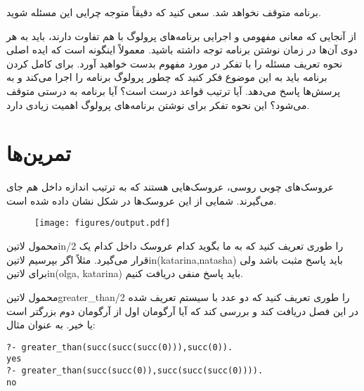 برنامه متوقف نخواهد شد. سعی کنید که دقیقاً متوجه چرایی این مسئله شوید.

از آنجایی که معانی مفهومی و اجرایی برنامه‌های پرولوگ با هم تفاوت دارند، باید به هر دوی آن‌ها در زمان نوشتن برنامه توجه داشته باشید. معمولاً اینگونه است که ایده اصلی نحوه تعریف مسئله را با تفکر در مورد مفهوم بدست خواهید آورد. برای کامل کردن برنامه باید به این موضوع فکر کنید که چطور پرولوگ برنامه را اجرا می‌کند و به پرسش‌ها پاسخ می‌دهد. آیا ترتیب قواعد درست است؟ آیا برنامه به درستی متوقف می‌شود؟ این نحوه تفکر برای نوشتن برنامه‌های پرولوگ اهمیت زیادی دارد.

\clearpage

\section{تمرین‌ها}
\begin{exercise}
عروسک‌های چوبی روسی، عروسک‌هایی هستند که به ترتیب اندازه داخل هم جای می‌گیرند. شمایی از این عروسک‌ها در شکل نشان داده شده است.

\begin{figure}[h]
\centering
\texttt{[image: figures/output.pdf]}
\label{fig:dataset-size-degree}
\end{figure}

محمول ‌لاتین{in/2} را طوری تعریف کنید که به ما بگوید کدام عروسک داخل کدام یک قرار می‌گیرد. مثلاً اگر بپرسیم ‌لاتین{in(katarina,natasha)} باید پاسخ مثبت باشد ولی برای ‌لاتین{in(olga, katarina)} باید پاسخ منفی دریافت کنیم.
\end{exercise}

\begin{exercise}
محمول ‌لاتین{greater\_than/2} را طوری تعریف کنید که دو عدد با سیستم تعریف شده در این فصل دریافت کند و بررسی کند که آیا آرگومان اول از آرگومان دوم بزرگتر است یا خیر. به عنوان مثال:
\begin{latin}
\begin{lstlisting}
?- greater_than(succ(succ(succ(0))),succ(0)).
yes
?- greater_than(succ(succ(0)),succ(succ(succ(0)))).
no
\end{lstlisting}
\end{latin}
\end{exercise}

